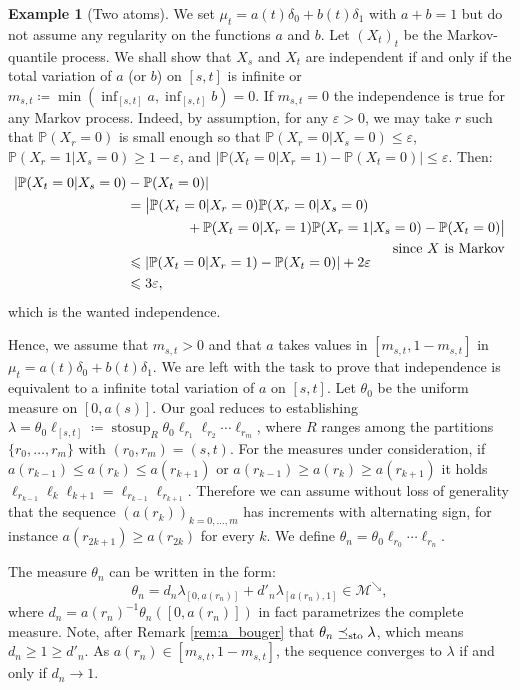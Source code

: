 \documentclass[JEP,XML,SOM,Unicode,NoEqCountersInSection,NoFloatCountersInSection,published]{cedram}
\theoremstyle{plain}
\theoremstyle{definition}
\newtheorem{ex}[them]{Example}
\newcommand{\eqdef}{\coloneqq}
\let\eps\varepsilon
\newcommand{\la}{\lambda}
\renewcommand{\P}{\mathbb{P}}
\newcommand{\stosup}{\operatorname{stosup}}
\newcommand{\leqs}{\preceq_{\text{\rm sto}}}
\newcommand{\mdec}{\mathcal{M}^{\scriptscriptstyle\searrow}}
\begin{document}
\begin{ex}[Two atoms]\label{ex:two_atoms}
We set $\mu_t=a(t)\delta_0+b(t)\delta_1$ with $a+b=1$ but do not assume any regularity on the functions $a$ and $b$. Let $(X_t)_t$ be the Markov-quantile process. We shall show that $X_s$ and $X_t$ are independent if and only if the total variation of $a$ (or $b$) on $[s,t]$ is infinite or $m_{s,t}\eqdef \min(\inf_{[s,t]}a,\inf_{[s,t]} b)=0$. If $m_{s,t}=0$ the independence is true for any Markov process. Indeed, by assumption, for any $\eps>0$, we may take $r$ such that $\P(X_r=0)$ is small enough so that $\P(X_r=0|X_s=0)\leqslant\eps$, $\P(X_r=1|X_s=0)\geqslant1-\eps$, and $|\P(X_t=0|X_r=1)-\P(X_t=0)|\leqslant\eps$. Then:\vspace*{-3pt}
\begin{align*}
|\P(X_t=0|X_s=0)&-\P(X_t=0)|\\
&=\bigl|\P(X_t=0|X_r=0)\P(X_r=0|X_s=0)\\
&\hspace*{1.5cm}+\P(X_t=0|X_r=1)\P(X_r=1|X_s=0)-\P(X_t=0)\bigr|\\ &\hspace*{6.7cm}\text{since $X$ is Markov}\\[-5pt]
&\leqslant|\P(X_t=0|X_r=1)-\P(X_t=0)|+2\eps\\
&\leqslant3\eps,
\end{align*}
which is the wanted independence.

Hence, we assume that $m_{s,t}>0$ and that $a$ takes values in $[m_{s,t},1-m_{s,t}]$ in $\mu_t=a(t)\delta_0+b(t)\delta_1$. We are left with the task to prove that independence is equivalent to a infinite total variation of $a$ on $[s,t]$. Let $\theta_0$ be the uniform measure on $[0,a(s)]$. Our goal reduces to establishing $\la=\theta_0 \ell_{[s,t]}\eqdef\stosup_R \theta_0\ell_{r_1}\ell_{r_2}\cdots \ell_{r_m}$, where $R$ ranges among the partitions $\{r_0,\ldots, r_m\}$ with $(r_0,r_m)=(s,t)$. For the measures under consideration, if $a(r_{k-1})\leq a(r_k)\leq a(r_{k+1})$ or $a(r_{k-1})\geq a(r_k)\geq a(r_{k+1})$ it holds $\ell_{r_{k-1}} \ell_k \ell_{k+1}=\ell_{r_{k-1}} \ell_{r_{k+1}}$. Therefore we can assume without loss of generality that the sequence $(a(r_k))_{k=0,\ldots,m}$ has increments with alternating sign, for instance $a(r_{2k+1})\geq a(r_{2k})$ for every $k$. We define $\theta_n=\theta_0 \ell_{r_0}\cdots \ell_{r_n}$.

The measure $\theta_n$ can be written in the form:\vspace*{-3pt}
\[
\theta_n=d_n\la_{[0,a(r_n)]}+d'_n\la_{[a(r_n),1]}\in \mdec,
\]
where $d_n=a(r_n)^{-1}\theta_n([0,a(r_n)])$ in fact parametrizes the complete measure. Note, after Remark \ref{rem:a_bouger} that $\theta_n\leqs \la$, which means $d_n\geq 1\geq d'_n$. As $a(r_n)\in[m_{s,t}, 1-m_{s,t}]$, the sequence converges to $\la$ if and only if $d_n\to 1$.


\end{ex}
\end{document}
